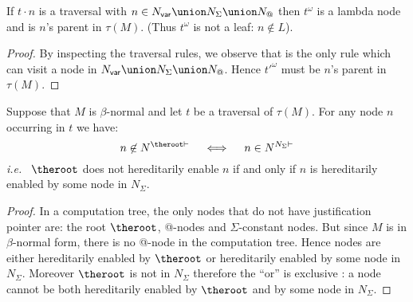 

\begin{lemma}
\label{lem:trav_last_not_leaf} If $t \cdot n $ is a traversal with
$n \in N_{\sf var} \union N_\Sigma \union N_@$ then $t^\omega$ is a
lambda node and is $n$'s parent in $\tau(M)$. (Thus $t^\omega$ is
not a leaf: $n\not\in L$).
\end{lemma}
\begin{proof}
By inspecting the traversal rules, we observe that 
is the only rule  which can visit a node in $N_{\sf var} \union
N_\Sigma \union N_@$. Hence $t'^\omega$ must be $n$'s parent in
$\tau(M)$.
\end{proof}


\begin{lemma}
\label{lem:betanorm_enabling}
Suppose that $M$ is $\beta$-normal and let $t$ be a traversal of $\tau(M)$.
For any node $n$ occurring in $t$ we have:
$$ n \not\in N^{\theroot\vdash} \quad \iff \quad n \in N^{N_{\Sigma}\vdash}$$
{\it i.e.}~ $\theroot$ does not hereditarily enable $n$ if and only if $n$ is
hereditarily enabled by some node in $N_\Sigma$.
\end{lemma}
\begin{proof}
 In a computation tree, the only nodes that do not have justification pointer are:
the root $\theroot$, @-nodes and $\Sigma$-constant nodes. But since $M$ is
in $\beta$-normal form, there is no @-node in the computation tree.
Hence nodes are either hereditarily enabled by $\theroot$ or hereditarily
enabled by some node in $N_\Sigma$. Moreover $\theroot$ is not in $N_\Sigma$
therefore the ``or'' is exclusive : a node cannot be both hereditarily
enabled by $\theroot$ and by some node in $N_\Sigma$.
\end{proof}


